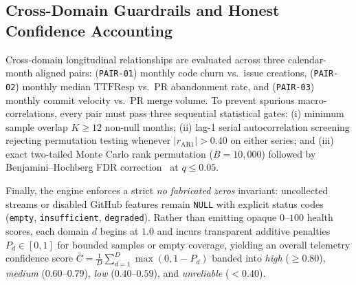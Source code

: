 \documentclass[conference]{IEEEtran}
\begin{document}
\subsection{Cross-Domain Guardrails and Honest Confidence Accounting}
Cross-domain longitudinal relationships are evaluated across three calendar-month aligned pairs: (\texttt{PAIR-01}) monthly code churn vs.\ issue creations, (\texttt{PAIR-02}) monthly median $\text{TTFResp}$ vs.\ PR abandonment rate, and (\texttt{PAIR-03}) monthly commit velocity vs.\ PR merge volume. To prevent spurious macro-correlations, every pair must pass three sequential statistical gates: (i) minimum sample overlap $K \ge 12$ non-null months; (ii) lag-1 serial autocorrelation screening rejecting permutation testing whenever $|r_{\text{AR1}}| > 0.40$ on either series; and (iii) exact two-tailed Monte Carlo rank permutation ($B=10{,}000$) followed by Benjamini--Hochberg FDR correction~\cite{benjamini1995controlling} at $q \le 0.05$.

Finally, the engine enforces a strict \emph{no fabricated zeros} invariant: uncollected streams or disabled GitHub features remain \texttt{NULL} with explicit status codes (\texttt{empty}, \texttt{insufficient}, \texttt{degraded}). Rather than emitting opaque $0$--$100$ health scores, each domain $d$ begins at $1.0$ and incurs transparent additive penalties $P_d \in [0, 1]$ for bounded samples or empty coverage, yielding an overall telemetry confidence score $\bar{C} = \frac{1}{D}\sum_{d=1}^{D}\max(0, 1 - P_d)$ banded into \emph{high} ($\ge 0.80$), \emph{medium} ($0.60$--$0.79$), \emph{low} ($0.40$--$0.59$), and \emph{unreliable} ($<0.40$).
\end{document}
